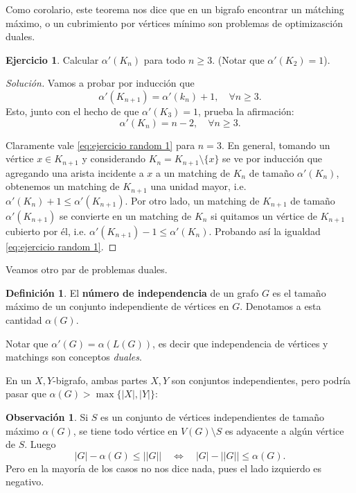 \documentclass[12pt]{report}
\theoremstyle{plain}
\theoremstyle{definition}
\newtheorem{definition}[theorem]{Definición}
\newtheorem{obs}[theorem]{Observación}
\newtheorem{exercise}[theorem]{Ejercicio}
\newenvironment{solution}{\begin{proof}[Solución]}{\end{proof}}
\newcommand{\abs}[1]{\left \vert #1 \right \vert}
\newcommand{\Abs}[1]{\left \vert \left \vert #1 \right \vert \right \vert}
\begin{document}
Como corolario, este teorema nos dice que en un bigrafo encontrar un mátching máximo, o un cubrimiento por vértices mínimo son problemas de optimizasción duales.

\begin{exercise}
Calcular $\alpha ' (K_n)$ para todo $n \geq 3$. (Notar que $\alpha ' (K_2) = 1$).
\end{exercise}
\begin{solution}
Vamos a probar por inducción que
\begin{equation}\label{eq:ejercicio random 1}
\alpha ' (K_{n+1}) = \alpha ' (k_{n}) + 1, \quad \forall n \geq 3.
\end{equation}
Esto, junto con el hecho de que $\alpha ' (K_3) = 1$, prueba la afirmación:
\[
    \alpha ' (K_n) = n-2, \quad \forall n \geq 3.
\]

Claramente vale \eqref{eq:ejercicio random 1} para $n = 3$. En general, tomando un vértice $x \in K_{n+1}$ y considerando $K_n = K_{n+1} \setminus \{x \}$ se ve por inducción que agregando una arista incidente a $x$ a un matching de $K_n$ de tamaño $\alpha ' (K_n)$, obtenemos un matching de $K_{n+1}$ una unidad mayor, i.e. $\alpha ' (K_n) + 1 \leq \alpha ' (K_{n+1})$. Por otro lado, un matching de $K_{n+1}$ de tamaño $\alpha ' (K_{n+1})$ se convierte en un matching de $K_n$ si quitamos un vértice de $K_{n+1}$ cubierto por él, i.e. $\alpha ' (K_{n+1}) - 1 \leq \alpha ' (K_n)$. Probando así la igualdad \eqref{eq:ejercicio random 1}.
\end{solution}

\bigskip

Veamos otro par de problemas duales.

\begin{definition}
El \textbf{número de independencia} de un grafo $G$ es el tamaño máximo de un conjunto independiente de vértices en $G$. Denotamos a esta cantidad $\alpha (G)$.
\end{definition}
Notar que $\alpha ' (G) = \alpha (L(G))$, es decir que independencia de vértices y matchings son conceptos \textit{duales}.

En un $X,Y$-bigrafo, ambas partes $X,Y$ son conjuntos independientes, pero podría pasar que $\alpha (G) > \max \{ \abs X, \abs Y \}$:

\begin{obs}
Si $S$ es un conjunto de vértices independientes de tamaño máximo $\alpha (G)$, se tiene todo vértice en $V(G) \setminus S$ es adyacente a algún vértice de $S$. Luego
\[
    \abs G - \alpha (G) \leq \Abs G \quad \Leftrightarrow \quad \abs G - \Abs G \leq \alpha (G).
\]
Pero en la mayoría de los casos no nos dice nada, pues el lado izquierdo es negativo.
\end{obs}
\end{document}
